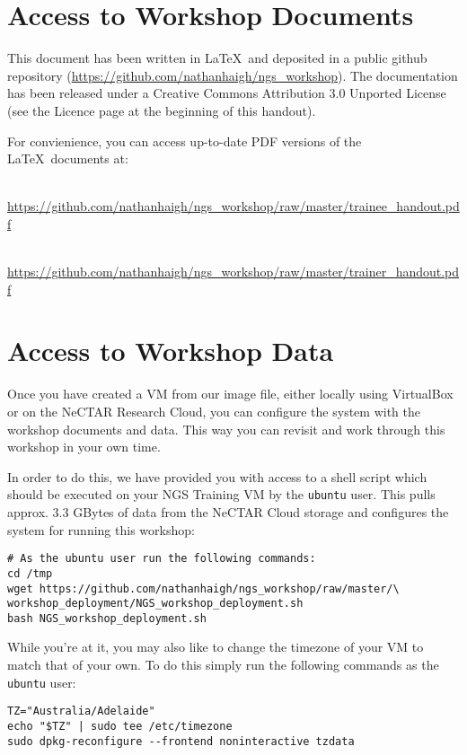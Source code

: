 \section{Access to Workshop Documents}

This document has been written in \LaTeX\ and deposited in a public github
repository (\url{https://github.com/nathanhaigh/ngs_workshop}). The
documentation has been released under a Creative Commons Attribution 3.0
Unported License (see the Licence page at the beginning of this handout).

For convienience, you can access up-to-date PDF versions of the \LaTeX\ documents at:
\begin{description}[style=multiline,labelindent=0cm,align=left,leftmargin=0.5cm]
\item[Trainee Handout]\hfill\\
\url{https://github.com/nathanhaigh/ngs_workshop/raw/master/trainee_handout.pdf}
\item[Trainer Handout]\hfill\\
\url{https://github.com/nathanhaigh/ngs_workshop/raw/master/trainer_handout.pdf}
\end{description}

\section{Access to Workshop Data}
Once you have created a VM from our image file, either locally using VirtualBox
or on the NeCTAR Research Cloud, you can configure the system with the workshop
documents and data. This way you can revisit and work through this workshop in
your own time.

In order to do this, we have provided you with access to a shell script which
should be executed on your NGS Training VM by the \texttt{ubuntu} user. This pulls
approx. 3.3 GBytes of data from the NeCTAR Cloud storage and configures the system
for running this workshop:

\begin{lstlisting}
# As the ubuntu user run the following commands:
cd /tmp
wget https://github.com/nathanhaigh/ngs_workshop/raw/master/\
workshop_deployment/NGS_workshop_deployment.sh
bash NGS_workshop_deployment.sh
\end{lstlisting}

While you're at it, you may also like to change the timezone of your VM to match
that of your own. To do this simply run the following commands as the
\texttt{ubuntu} user:
\begin{lstlisting}
TZ="Australia/Adelaide"
echo "$TZ" | sudo tee /etc/timezone
sudo dpkg-reconfigure --frontend noninteractive tzdata
\end{lstlisting}

